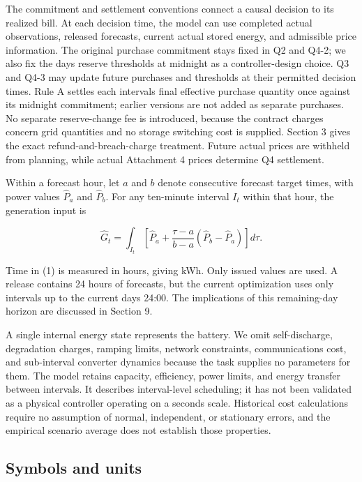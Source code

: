 The commitment and settlement conventions connect a causal decision to its realized bill. At each decision time, the model can use completed actual observations, released forecasts, current actual stored energy, and admissible price information. The original purchase commitment stays fixed in Q2 and Q4-2; we also fix the day\textquotesingle s reserve thresholds at midnight as a controller-design choice. Q3 and Q4-3 may update future purchases and thresholds at their permitted decision times. Rule A settles each interval\textquotesingle s final effective purchase quantity once against its midnight commitment; earlier versions are not added as separate purchases. No separate reserve-change fee is introduced, because the contract charges concern grid quantities and no storage switching cost is supplied. Section 3 gives the exact refund-and-breach-charge treatment. Future actual prices are withheld from planning, while actual Attachment 4 prices determine Q4 settlement.


Within a forecast hour, let \(a\) and \(b\) denote consecutive forecast target times, with power values \(\widehat P_a\) and \(\widehat P_b\). For any ten-minute interval \(I_t\) within that hour, the generation input is

\[
\widehat G_t=\int_{I_t}\left[\widehat P_a+
\frac{\tau-a}{b-a}(\widehat P_b-\widehat P_a)\right]d\tau. \tag{1}
\]

Time in (1) is measured in hours, giving kWh. Only issued values are used. A release contains 24 hours of forecasts, but the current optimization uses only intervals up to the current day\textquotesingle s 24:00. The implications of this remaining-day horizon are discussed in Section 9.

A single internal energy state represents the battery. We omit self-discharge, degradation charges, ramping limits, network constraints, communications cost, and sub-interval converter dynamics because the task supplies no parameters for them. The model retains capacity, efficiency, power limits, and energy transfer between intervals. It describes interval-level scheduling; it has not been validated as a physical controller operating on a seconds scale. Historical cost calculations require no assumption of normal, independent, or stationary errors, and the empirical scenario average does not establish those properties.

\subsection{Symbols and units}\label{symbols-and-units}

